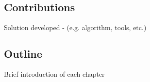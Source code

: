 \subsection{Contributions}
Solution developed - (e.g. algorithm, tools, etc.)




\subsection{Outline}


Brief introduction of each chapter %


